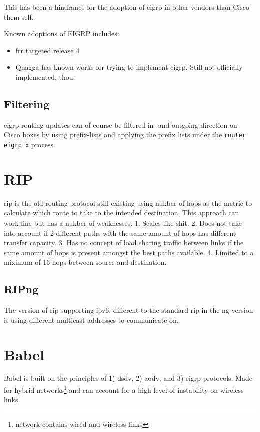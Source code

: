 This has been a hindrance for the adoption of \gls{eigrp} in other vendors than Cisco them-self.

Known adoptions of EIGRP includes:
\begin{itemize}
    \item \gls{frr} targeted release 4\cite{Frr30-4047:online}
    \item Quagga has known works for trying to implement \gls{eigrp}. Still not officially implemented, thou.
\end{itemize}

\subsection{Filtering}

\gls{eigrp} routing updates can of course be filtered in- and outgoing direction on Cisco boxes by using prefix-lists and applying the prefix lists under the \texttt{router eigrp x} process.

\newpage

\section{RIP}

rip is the old routing protocol still existing using nukber-of-hops as the metric to calculate which route to take to the intended destination. This approach can work fine but has a nukber of weaknesses.
1. Scales like shit.
2. Does not take into account if 2 different paths with the same amount of hops has different transfer capacity.
3. Has no concept of load sharing traffic between links if the same amount of hops is present amongst the best paths available.
4. Limited to a miximum of 16 hops between source and destination.

\newpage

\subsection{RIPng}

The version of rip supporting ipv6. different to the standard rip in the ng version is using different multicast addresses to communicate on.

\newpage

\section{Babel}

Babel is built on the principles of 1) \gls{dsdv}, 2) \gls{aodv}, and 3)
\gls{eigrp} protocols.
Made for hybrid networks\footnote{network contains wired and wireless links}
and can account for a high level of instability on wireless links.

